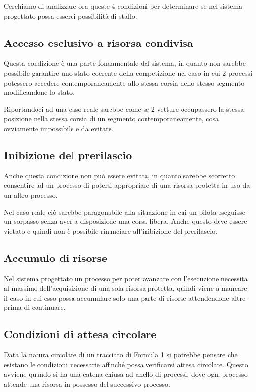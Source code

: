 \documentclass[a4paper,11pt, twoside, openright]{book}
\begin{document}
      Cerchiamo di analizzare ora queste 4 condizioni per determinare se nel sistema progettato
      possa esserci possibilità di stallo.
      
      \subsection{Accesso esclusivo a risorsa condivisa}
        Questa condizione è una parte fondamentale del sistema, in quanto non sarebbe possibile
	garantire uno stato coerente della competizione nel caso in cui 2 processi potessero accedere
	contemporaneamente allo stessa corsia dello stesso segmento modificandone lo stato.
	
	Riportandoci ad una caso reale sarebbe come se 2 vetture occupassero la stessa posizione nella stessa
	corsia di un segmento contemporaneamente,
	cosa ovviamente impossibile e da evitare.
	
      \subsection{Inibizione del prerilascio}
        Anche questa condizione non può essere evitata, in quanto sarebbe scorretto consentire ad un processo
	di potersi appropriare di una risorsa protetta in uso da un altro processo.
	
	Nel caso reale ciò sarebbe paragonabile alla situazione in cui un pilota eseguisse un sorpasso
	senza aver a disposizione una corsa libera. Anche questo deve essere vietato e quindi
	non è possibile rinunciare all'inibizione del prerilascio.
	
      \subsection{Accumulo di risorse}
        Nel sistema progettato un processo per poter avanzare con l'esecuzione necessita
	al massimo dell'acquisizione di una sola risorsa protetta, quindi viene a mancare il caso in cui esso possa accumulare
	solo una parte di risorse attendendone altre prima di continuare.
	
      \subsection{Condizioni di attesa circolare}
        Data la natura circolare di un tracciato di Formula 1 si potrebbe pensare che esistano le condizioni necessarie
	affinché possa verificarsi attesa circolare. Questo avviene quando si ha una catena chiusa ad anello 
	di processi, dove ogni processo attende una risorsa in possesso del successivo processo.
	
\end{document}
